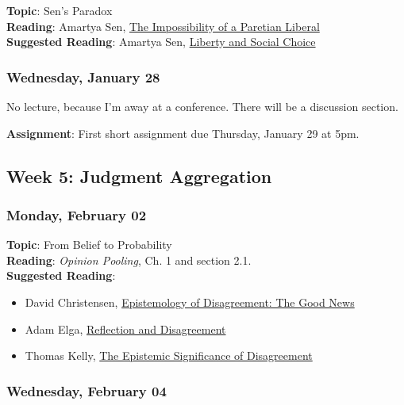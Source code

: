 \documentclass[
  letterpaper,
  DIV=11,
  numbers=noendperiod]{scrartcl}
\providecommand{\tightlist}{%
  \setlength{\itemsep}{0pt}\setlength{\parskip}{0pt}}
\begin{document}
\textbf{Topic}: Sen's Paradox\\
\textbf{Reading}: Amartya Sen,
\href{https://www.jstor.org/stable/1829633?seq=1}{The Impossibility of a
Paretian Liberal}\\
\textbf{Suggested Reading}: Amartya Sen,
\href{https://www.jstor.org/stable/2026284?seq=1}{Liberty and Social
Choice}

\subsubsection{Wednesday, January 28}\label{wednesday-january-28}

No lecture, because I'm away at a conference. There will be a discussion
section.

\textbf{Assignment}: First short assignment due Thursday, January 29 at
5pm.

\subsection{Week 5: Judgment
Aggregation}\label{week-5-judgment-aggregation}

\subsubsection{Monday, February 02}\label{monday-february-02}

\textbf{Topic}: From Belief to Probability\\
\textbf{Reading}: \emph{Opinion Pooling}, Ch. 1 and section 2.1.\\
\textbf{Suggested Reading}:

\begin{itemize}
\tightlist
\item
  David Christensen,
  \href{https://philpapers.org/go.pl?id=CHREOD&proxyId=&u=https\%3A\%2F\%2Fphilpapers.org\%2Farchive\%2FCHREOD.pdf}{Epistemology
  of Disagreement: The Good News}
\item
  Adam Elga,
  \href{https://philsci-archive.pitt.edu/2940/1/refdis.pdf}{Reflection
  and Disagreement}
\item
  Thomas Kelly,
  \href{https://philpapers.org/go.pl?id=KELTES-3&proxyId=&u=https\%3A\%2F\%2Fwww.princeton.edu\%2F~tkelly\%2Fesod.pdf}{The
  Epistemic Significance of Disagreement}
\end{itemize}

\subsubsection{Wednesday, February 04}\label{wednesday-february-04}
\end{document}
